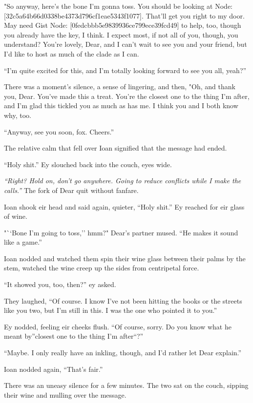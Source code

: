 "So anyway, here's the bone I'm gonna toss. You should be looking at Node: {[}32c5a64b66d0338be4373d796cf1eae5343f1077{]}. That'll get you right to my door. May need Gist Node: {[}0fedcbbb5e9839936ce799ece39fcd49{]} to help, too, though you already have the key, I think. I expect most, if not all of you, though, you understand? You're lovely, Dear, and I can't wait to see you and your friend, but I'd like to host as much of the clade as I can.

``I'm quite excited for this, and I'm totally looking forward to see you all, yeah?''

There was a moment's silence, a sense of lingering, and then, "Oh, and thank you, Dear. You've made this a treat. You're the closest one to the thing I'm after, and I'm glad this tickled you as much as has me. I think you and I both know why, too.

``Anyway, see you soon, fox. Cheers.''

The relative calm that fell over Ioan signified that the message had ended.

``Holy shit.'' Ey slouched back into the couch, eyes wide.

\emph{``Right? Hold on, don't go anywhere. Going to reduce conflicts while I make the calls.''} The fork of Dear quit without fanfare.

Ioan shook eir head and said again, quieter, ``Holy shit.'' Ey reached for eir glass of wine.

"``Bone I'm going to toss,'' hmm?" Dear's partner mused. ``He makes it sound like a game.''

Ioan nodded and watched them spin their wine glass between their palms by the stem, watched the wine creep up the sides from centripetal force.

``It showed you, too, then?'' ey asked.

They laughed, ``Of course. I know I've not been hitting the books or the streets like you two, but I'm still in this. I was the one who pointed it to you.''

Ey nodded, feeling eir cheeks flush. ``Of course, sorry. Do you know what he meant by''closest one to the thing I'm after``?''

``Maybe. I only really have an inkling, though, and I'd rather let Dear explain.''

Ioan nodded again, ``That's fair.''

There was an uneasy silence for a few minutes. The two sat on the couch, sipping their wine and mulling over the message.

